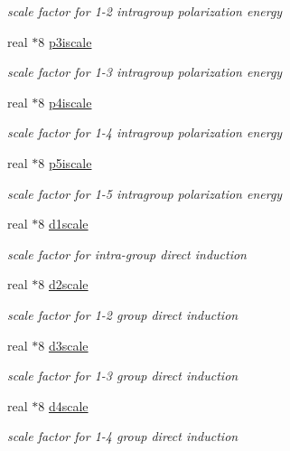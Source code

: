\begin{DoxyCompactItemize}
\begin{DoxyCompactList}\small\item\em scale factor for 1-\/2 intragroup polarization energy \end{DoxyCompactList}\item 
real $\ast$8 \hyperlink{classpolpot_ae7adb835efeba4114c37590e29930704}{p3iscale}
\begin{DoxyCompactList}\small\item\em scale factor for 1-\/3 intragroup polarization energy \end{DoxyCompactList}\item 
real $\ast$8 \hyperlink{classpolpot_a2a48e35fedd82d2565eb7ec90e2f6997}{p4iscale}
\begin{DoxyCompactList}\small\item\em scale factor for 1-\/4 intragroup polarization energy \end{DoxyCompactList}\item 
real $\ast$8 \hyperlink{classpolpot_ac2002e97127817d06b0dad560e78be87}{p5iscale}
\begin{DoxyCompactList}\small\item\em scale factor for 1-\/5 intragroup polarization energy \end{DoxyCompactList}\item 
real $\ast$8 \hyperlink{classpolpot_a1afa5b69e7d08623c60ec582b49497b9}{d1scale}
\begin{DoxyCompactList}\small\item\em scale factor for intra-\/group direct induction \end{DoxyCompactList}\item 
real $\ast$8 \hyperlink{classpolpot_a09dbcc2f2fc3ff7e247b06a89671c00e}{d2scale}
\begin{DoxyCompactList}\small\item\em scale factor for 1-\/2 group direct induction \end{DoxyCompactList}\item 
real $\ast$8 \hyperlink{classpolpot_ae8e0a808dea2c739dcff65342f4c22e7}{d3scale}
\begin{DoxyCompactList}\small\item\em scale factor for 1-\/3 group direct induction \end{DoxyCompactList}\item 
real $\ast$8 \hyperlink{classpolpot_aa5806bec776eadd0b1f3c68e7fddc71f}{d4scale}
\begin{DoxyCompactList}\small\item\em scale factor for 1-\/4 group direct induction \end{DoxyCompactList}\item 

\end{DoxyCompactItemize}
